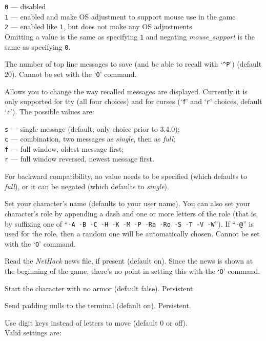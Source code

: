 {\tt 0} --- disabled\\
{\tt 1} --- enabled and make OS adjustment to support mouse use in the game\\
{\tt 2} --- enabled like {\tt 1}, but does not make any OS adjustments\\

Omitting a value is the same as specifying {\tt 1}
and negating
{\it mouse\verb+_+support\/}
is the same as specifying {\tt 0}.
\item[\ib{msghistory}]
The number of top line messages to save (and be able to recall
with `{\tt \^{}P}') (default 20).
Cannot be set with the `{\tt O}' command.
\item[\ib{msg\verb+_+window}]
Allows you to change the way recalled messages are displayed.
Currently it is only supported for tty (all four choices) and for curses
(`{\tt f}' and `{\tt r}' choices, default `{\tt r}').
The possible values are:

{\tt s} --- single message (default; only choice prior to 3.4.0);\\
{\tt c} --- combination, two messages as {\it single\/}, then as {\it full\/};\\
{\tt f} --- full window, oldest message first;\\
{\tt r} --- full window reversed, newest message first.

For backward compatibility, no value needs to be specified (which
defaults to {\it full\/}), or it can be negated (which defaults
to {\it single\/}).
\item[\ib{name}]
Set your character's name (defaults to your user name).  You can also
set your character's role by appending a dash and one or more letters of
the role (that is, by suffixing one of
``{\tt -A -B -C -H -K -M -P -Ra -Ro -S -T -V -W}'').
If ``{\tt -@}'' is used for the role, then a random one will be
automatically chosen.
Cannot be set with the `{\tt O}' command.
\item[\ib{news}]
Read the {\it NetHack\/} news file, if present (default on).
Since the news is shown at the beginning of the game, there's no point
in setting this with the `{\tt O}' command.
\item[\ib{nudist}]
Start the character with no armor (default false).  Persistent.
\item[\ib{null}]
Send padding nulls to the terminal (default on).  Persistent.
\item[\ib{number\verb+_+pad}]
Use digit keys instead of letters to move (default 0 or off).\\
Valid settings are:

